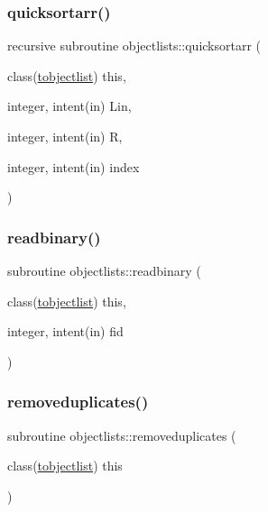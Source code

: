 \mbox{\label{namespaceobjectlists_a663520be1986351d7c16a9fccb40b6e8}} 
\subsubsection{\texorpdfstring{quicksortarr()}{quicksortarr()}}
{\footnotesize\ttfamily recursive subroutine objectlists\+::quicksortarr (\begin{DoxyParamCaption}\item[{class(\mbox{\hyperlink{structobjectlists_1_1tobjectlist}{tobjectlist}})}]{this,  }\item[{integer, intent(in)}]{Lin,  }\item[{integer, intent(in)}]{R,  }\item[{integer, intent(in)}]{index }\end{DoxyParamCaption})\hspace{0.3cm}{\ttfamily [private]}}

\mbox{\label{namespaceobjectlists_a68cfe6fa523fb21df53a6f58e5fb498e}} 
\subsubsection{\texorpdfstring{readbinary()}{readbinary()}}
{\footnotesize\ttfamily subroutine objectlists\+::readbinary (\begin{DoxyParamCaption}\item[{class(\mbox{\hyperlink{structobjectlists_1_1tobjectlist}{tobjectlist}})}]{this,  }\item[{integer, intent(in)}]{fid }\end{DoxyParamCaption})\hspace{0.3cm}{\ttfamily [private]}}

\mbox{\label{namespaceobjectlists_af660367ba45ff04c784f5ea3c01560ea}} 
\subsubsection{\texorpdfstring{removeduplicates()}{removeduplicates()}}
{\footnotesize\ttfamily subroutine objectlists\+::removeduplicates (\begin{DoxyParamCaption}\item[{class(\mbox{\hyperlink{structobjectlists_1_1tobjectlist}{tobjectlist}})}]{this }\end{DoxyParamCaption})\hspace{0.3cm}{\ttfamily [private]}}

